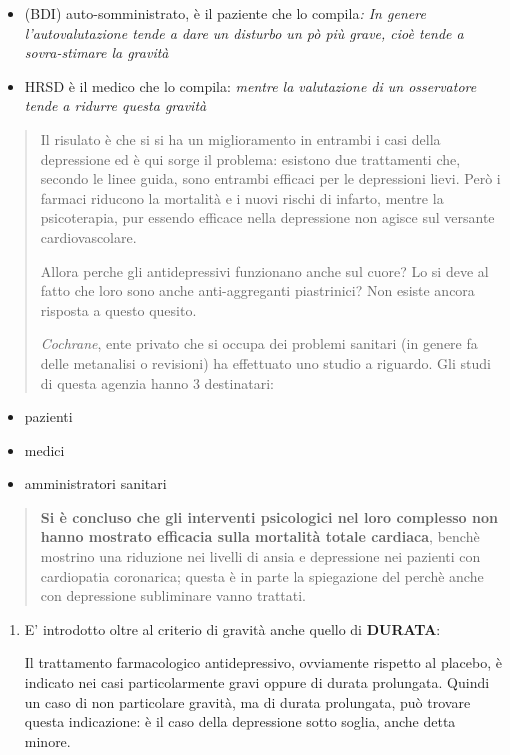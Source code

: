 \documentclass[]{article}
\begin{document}
\begin{itemize}
\item
  (BDI) auto-somministrato, è il paziente che lo compila\emph{: In
  genere l'autovalutazione tende a dare un disturbo un pò più grave,
  cioè tende a sovra-stimare la gravità}
\item
  HRSD è il medico che lo compila: \emph{mentre la valutazione di un
  osservatore tende a ridurre questa gravità}
\end{itemize}

\begin{quote}
Il risulato è che si si ha un miglioramento in entrambi i casi della
depressione ed è qui sorge il problema: esistono due trattamenti che,
secondo le linee guida, sono entrambi efficaci per le depressioni lievi.
Però i farmaci riducono la mortalità e i nuovi rischi di infarto, mentre
la psicoterapia, pur essendo efficace nella depressione non agisce sul
versante cardiovascolare.

Allora perche gli antidepressivi funzionano anche sul cuore? Lo si deve
al fatto che loro sono anche anti-aggreganti piastrinici? Non esiste
ancora risposta a questo quesito.

\emph{Cochrane}, ente privato che si occupa dei problemi sanitari (in
genere fa delle metanalisi o revisioni) ha effettuato uno studio a
riguardo. Gli studi di questa agenzia hanno 3 destinatari:
\end{quote}

\begin{itemize}
\item
  pazienti
\item
  medici
\item
  amministratori sanitari
\end{itemize}

\begin{quote}
\textbf{Si è concluso che gli interventi psicologici nel loro complesso
non hanno mostrato efficacia sulla mortalità totale cardiaca}, benchè
mostrino una riduzione nei livelli di ansia e depressione nei pazienti
con cardiopatia coronarica; questa è in parte la spiegazione del perchè
anche con depressione subliminare vanno trattati.
\end{quote}

\begin{enumerate}
\def\labelenumi{\arabic{enumi}.}
\item
  E' introdotto oltre al criterio di gravità anche quello di
  \textbf{DURATA}:

  Il trattamento farmacologico antidepressivo, ovviamente rispetto al
  placebo, è indicato nei casi particolarmente gravi oppure di durata
  prolungata. Quindi un caso di non particolare gravità, ma di durata
  prolungata, può trovare questa indicazione: è il caso della
  depressione sotto soglia, anche detta minore.
\end{enumerate}
\end{document}
